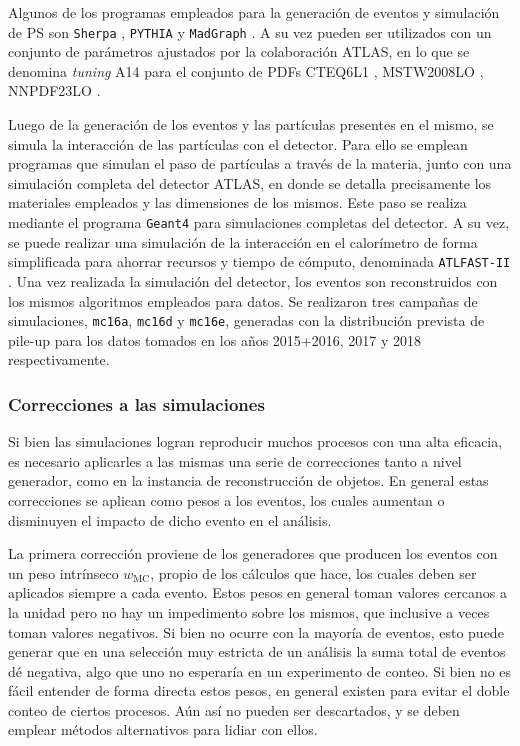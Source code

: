 Algunos de los programas empleados para la generación de eventos y simulación de PS son \texttt{Sherpa} \cite{SherpaGen, Schumann:2007mg, Bothmann:2019yzt}, \texttt{PYTHIA} \cite{Sjostrand:2014zea} y \texttt{MadGraph} \cite{Alwall:2014hca}. A su vez pueden ser utilizados con un conjunto de parámetros ajustados por la colaboración ATLAS, en lo que se denomina \textit{tuning} A14 \cite{ATL-PHYS-PUB-2014-021} para el conjunto de PDFs CTEQ6L1 \cite{Pumplin:2002vw}, MSTW2008LO \cite{Martin:2009iq, Martin:2009bu, Martin_2010}, NNPDF23LO \cite{Ball:2012cx,Ball:2014uwa}. 


Luego de la generación de los eventos y las partículas presentes en el mismo, se simula la interacción de las partículas con el detector. 
Para ello se emplean programas que simulan el paso de partículas a través de la materia, junto con una simulación completa del detector ATLAS, en donde se detalla precisamente los materiales empleados y las dimensiones de los mismos. Este paso se realiza mediante el programa \texttt{Geant4} \cite{Geant4} para simulaciones completas del detector. A su vez, se puede realizar una simulación de la interacción en el calorímetro de forma simplificada para ahorrar recursos y tiempo de cómputo, denominada \texttt{ATLFAST-II} \cite{Richter-Was:683751,Lukas_2012}. Una vez realizada la simulación del detector, los eventos son reconstruidos con los mismos algoritmos empleados para datos. Se realizaron tres campañas de simulaciones, \texttt{mc16a}, \texttt{mc16d} y \texttt{mc16e}, generadas con la distribución prevista de pile-up para los datos tomados en los años 2015+2016, 2017 y 2018 respectivamente.






\subsubsection{Correcciones a las simulaciones}\label{sec:mc_weights}

Si bien las simulaciones logran reproducir muchos procesos con una alta eficacia, es necesario aplicarles a las mismas una serie de correcciones tanto a nivel generador, como en la instancia de reconstrucción de objetos. En general estas correcciones se aplican como pesos a los eventos, los cuales aumentan o disminuyen el impacto de dicho evento en el análisis.

La primera corrección proviene de los generadores que producen los eventos con un peso intrínseco $w_\text{MC}$, propio de los cálculos que hace, los cuales deben ser aplicados siempre a cada evento. Estos pesos en general toman valores cercanos a la unidad pero no hay un impedimento sobre los mismos, que inclusive a veces toman valores negativos. Si bien no ocurre con la mayoría de eventos, esto puede generar que en una selección muy estricta de un análisis la suma total de eventos dé negativa, algo que uno no esperaría en un experimento de conteo. Si bien no es fácil entender de forma directa estos pesos, en general existen para evitar el doble conteo de ciertos procesos. Aún así no pueden ser descartados, y se deben emplear métodos alternativos para lidiar con ellos.

